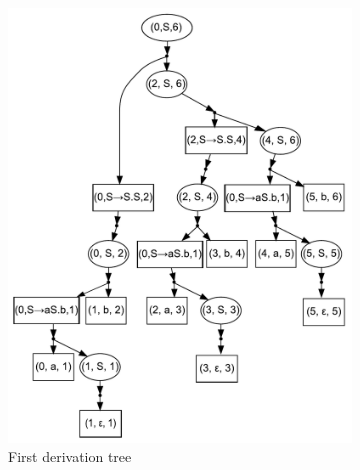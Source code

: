 \begin{figure}[ht]
\begin{center}
\begin{subfigure}[b]{0.3\textwidth}
        \includegraphics[width=\textwidth]{dot/Brackets1.pdf}
        \caption{First derivation tree}
        \label{tree1}        
    \end{subfigure}
    ~
    \begin{subfigure}[b]{0.3\textwidth}

\end{subfigure}
\end{center}
\end{figure}
